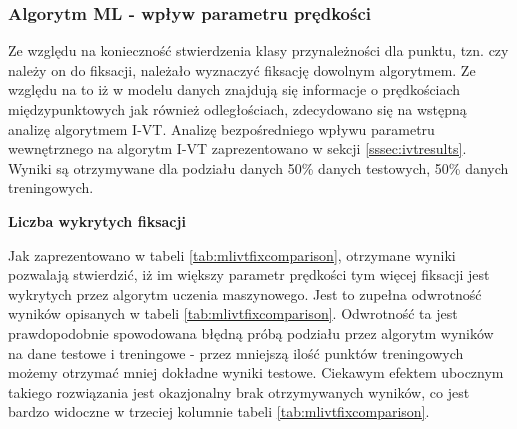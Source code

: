 \subsubsection{Algorytm ML - wpływ parametru prędkości}
\label{sssec:mlivt}
Ze względu na konieczność stwierdzenia klasy przynależności dla punktu, tzn. czy należy on do fiksacji, należało wyznaczyć fiksację dowolnym algorytmem. Ze względu na to iż w modelu danych znajdują się informacje o prędkościach międzypunktowych jak również odległościach, zdecydowano się na wstępną analizę algorytmem I-VT. Analizę bezpośredniego wpływu parametru wewnętrznego na algorytm I-VT zaprezentowano w sekcji \ref{sssec:ivtresults}. Wyniki są otrzymywane dla podziału danych 50\% danych testowych, 50\% danych treningowych.\par
\textbf{Liczba wykrytych fiksacji}\par
Jak zaprezentowano w tabeli \ref{tab:mlivtfixcomparison}, otrzymane wyniki pozwalają stwierdzić, iż im większy parametr prędkości tym więcej fiksacji jest wykrytych przez algorytm uczenia maszynowego. Jest to zupełna odwrotność wyników opisanych w tabeli \ref{tab:mlivtfixcomparison}. Odwrotność ta jest prawdopodobnie spowodowana błędną próbą podziału przez algorytm wyników na dane testowe i treningowe - przez mniejszą ilość punktów treningowych możemy otrzymać mniej dokładne wyniki testowe. Ciekawym efektem ubocznym takiego rozwiązania jest okazjonalny brak otrzymywanych wyników, co jest bardzo widoczne w trzeciej kolumnie tabeli \ref{tab:mlivtfixcomparison}.\par
